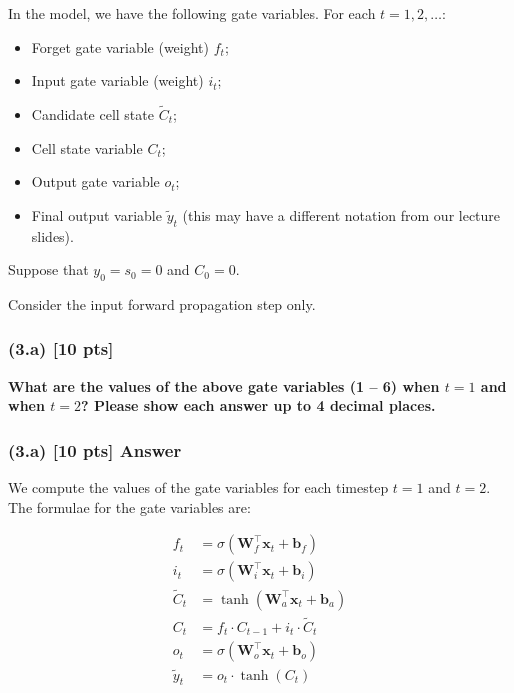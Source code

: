 In the model, we have the following gate variables. For each \( t = 1, 2, \dots \):
\begin{itemize}
    \item Forget gate variable (weight) \( f_t \);
    \item Input gate variable (weight) \( i_t \);
    \item Candidate cell state \( \tilde{C}_t \);
    \item Cell state variable \( C_t \);
    \item Output gate variable \( o_t \);
    \item Final output variable \( \tilde{y}_t \) (this may have a different notation from our lecture slides).
\end{itemize}

Suppose that \( y_0 = s_0 = 0 \) and \( C_0 = 0 \).

Consider the input forward propagation step only.

\subsubsection*{(3.a) [10 pts]} \textbf{What are the values of the above gate variables (1 – 6) when \( t = 1 \) and when \( t = 2 \)? Please show each answer up to 4 decimal places.}

\subsubsection*{(3.a) [10 pts] Answer}

We compute the values of the gate variables for each timestep \( t = 1 \) and \( t = 2 \). The formulae for the gate variables are:

\begin{align}
    f_t &= \sigma(\mathbf{W}_f^\top \mathbf{x}_t + \mathbf{b}_f) \nonumber \\
    i_t &= \sigma(\mathbf{W}_i^\top \mathbf{x}_t + \mathbf{b}_i) \nonumber \\
    \tilde{C}_t &= \tanh(\mathbf{W}_a^\top \mathbf{x}_t + \mathbf{b}_a) \nonumber \\
    C_t &= f_t \cdot C_{t-1} + i_t \cdot \tilde{C}_t \nonumber \\
    o_t &= \sigma(\mathbf{W}_o^\top \mathbf{x}_t + \mathbf{b}_o) \nonumber \\
    \tilde{y}_t &= o_t \cdot \tanh(C_t)\nonumber 
\end{align}

